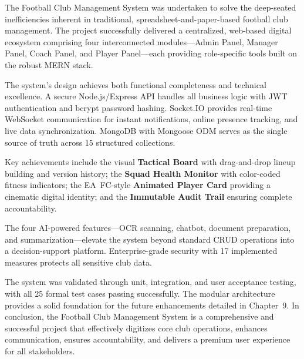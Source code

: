 \documentclass[12pt,a4paper,oneside]{report}
\begin{document}
The Football Club Management System was undertaken to solve the deep-seated inefficiencies inherent in traditional, spreadsheet-and-paper-based football club management. The project successfully delivered a centralized, web-based digital ecosystem comprising four interconnected modules---Admin Panel, Manager Panel, Coach Panel, and Player Panel---each providing role-specific tools built on the robust MERN stack.

The system's design achieves both functional completeness and technical excellence. A secure Node.js/Express API handles all business logic with JWT authentication and bcrypt password hashing. Socket.IO provides real-time WebSocket communication for instant notifications, online presence tracking, and live data synchronization. MongoDB with Mongoose ODM serves as the single source of truth across 15 structured collections.

Key achievements include the visual \textbf{Tactical Board} with drag-and-drop lineup building and version history; the \textbf{Squad Health Monitor} with color-coded fitness indicators; the EA~FC-style \textbf{Animated Player Card} providing a cinematic digital identity; and the \textbf{Immutable Audit Trail} ensuring complete accountability.

The four AI-powered features---OCR scanning, chatbot, document preparation, and summarization---elevate the system beyond standard CRUD operations into a decision-support platform. Enterprise-grade security with 17 implemented measures protects all sensitive club data.

The system was validated through unit, integration, and user acceptance testing, with all 25 formal test cases passing successfully. The modular architecture provides a solid foundation for the future enhancements detailed in Chapter~9. In conclusion, the Football Club Management System is a comprehensive and successful project that effectively digitizes core club operations, enhances communication, ensures accountability, and delivers a premium user experience for all stakeholders.
\end{document}
